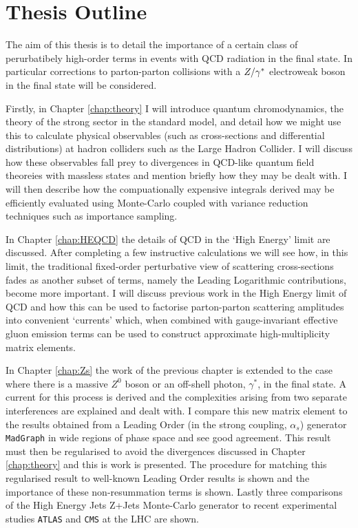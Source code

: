 \section{Thesis Outline}
\label{sec:outline}

	The aim of this thesis is to detail the importance of a certain class of perurbatibely high-order terms in events with QCD radiation in the final state.  In particular
	corrections to parton-parton collisions with a ${Z/\gamma^*}$ electroweak boson in the final state will be considered.

	Firstly, in Chapter \ref{chap:theory} I will introduce quantum chromodynamics, the theory of the strong sector in the standard model, and detail how we might use this
	to calculate physical observables (such as cross-sections and differential distributions) at hadron colliders such as the Large Hadron Collider.  I will discuss how
	these observables fall prey to divergences in QCD-like quantum field theoreies with massless states and mention briefly how they may be dealt with.  I will then
	describe how the compuationally expensive integrals derived may be efficiently evaluated using Monte-Carlo coupled with variance reduction techniques such as
	importance sampling.

	In Chapter \ref{chap:HEQCD} the details of QCD in the `High Energy' limit are discussed.  After completing a few instructive calculations we will see how,
	in this limit, the traditional fixed-order perturbative view of scattering cross-sections fades as another subset of terms, namely the Leading
	Logarithmic contributions, become more important.  I will discuss previous work in the High Energy limit of QCD and how this can be used to factorise
	parton-parton scattering amplitudes into convenient `currents' which, when combined with gauge-invariant effective gluon emission terms can be used to
	construct approximate high-multiplicity matrix elements.

	In Chapter \ref{chap:Zs} the work of the previous chapter is extended to the case where there is a massive $Z^0$ boson or an off-shell photon, $\gamma^*$,
	in the final state.  A current for this process is derived and the complexities arising from two separate interferences are explained and dealt with.  I
	compare this new matrix element to the results obtained from a Leading Order (in the strong coupling, $\alpha_s$) generator \texttt{MadGraph} in wide
	regions of phase space and see good agreement.  This result must then be regularised to avoid the divergences discussed in Chapter \ref{chap:theory} and
	this is work is presented.  The procedure for matching this regularised result to well-known Leading Order results is shown and the importance of these
	non-resummation terms is shown.  Lastly three comparisons of the High Energy Jets Z+Jets Monte-Carlo generator to recent experimental studies
	\texttt{ATLAS} and \texttt{CMS} at the LHC are shown.

